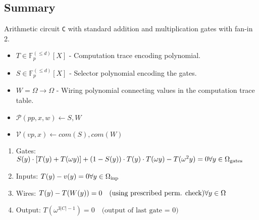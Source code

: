\documentclass[../lecture-notes.tex]{subfiles}
\begin{document}
\subsection{Summary}
\begin{tcolorbox}[title=Plonk,
    colback=blue!5!white,
    colframe=blue!75!black,
    colbacktitle=blue!25!white,
    coltitle=blue!20!black,
    fonttitle=\bfseries,
    boxrule=1.25pt,
    subtitle style={boxrule=0pt,
    colback=blue!20!white,
    colupper=blue!75!gray}]

\small Arithmetic circuit \texttt{C} with standard addition and multiplication gates with fan-in 2.

\begin{itemize}[label=]
    \item \(T \in \mathbb{F}_p^{(\leq d)}[X]\) - Computation trace encoding polynomial.
    \item \(S \in \mathbb{F}_p^{(\leq d)}[X]\) - Selector polynomial encoding the gates.
    \item \(W = \Omega \to \Omega\) - Wiring polynomial connecting values in the computation trace table.
\end{itemize}

\begin{center}
\begin{itemize}[label=]
    \item \(\mathcal{P}(pp, x, w) \leftarrow S, W\)
    \item \(\mathcal{V}(vp, x) \leftarrow com(S), com(W)\)
\end{itemize}
\end{center}

\begin{enumerate}
    \item Gates: \( S(y)\cdot[T(y) + T(\omega y)] + (1-S(y))\cdot T(y)\cdot T(\omega y) - T(\omega^{2}y) = 0 \hfill \forall y \in \Omega_{\text{gates}} \)
    \item Inputs: \( T(y) - v(y) = 0 \hfill \forall y \in \Omega_{\text{inp}} \)
    \item Wires: \( T(y) - T(W(y)) = 0 \quad \text{(using prescribed perm. check)} \hfill \forall y \in \Omega \)
    \item Output: \( T(\omega^{3|C|-1}) = 0 \quad \text{(output of last gate = 0)} \)
\end{enumerate}

\end{tcolorbox}
\end{document}
